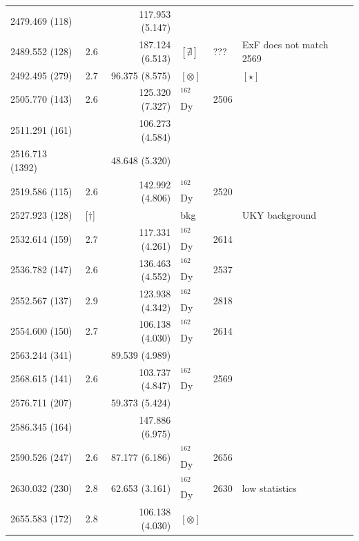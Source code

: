 \begin{landscape}
\begin{center}
\begin{longtable}{p{2.6cm}|p{1.2cm}|r|p{1.1cm}|p{2.0cm}|l}
  2479.469 (118) &            &117.953  (5.147)& & & \\   
  2489.552 (128) & 2.6        &187.124  (6.513)& $[\nexists]$ & ??? & ExF does not match 2569\\  
  2492.495 (279) & 2.7        & 96.375  (8.575)& $[\otimes]$ & &$[\star]$ \\   
  2505.770 (143) & 2.6        &125.320  (7.327)& $^{162}$Dy & 2506 & \\   
  2511.291 (161) &            &106.273  (4.584)& & & \\   
  2516.713 (1392)&            & 48.648  (5.320)& & & \\   
  2519.586 (115) & 2.6        &142.992  (4.806)& $^{162}$Dy & 2520 & \\   %
  2527.923 (128) & [$\dagger$]  && bkg & & UKY background \\   
  2532.614 (159) & 2.7        &117.331  (4.261)& $^{162}$Dy & 2614 & \\   
  2536.782 (147) & 2.6        &136.463  (4.552)& $^{162}$Dy & 2537 & \\
  2552.567 (137) & 2.9        &123.938  (4.342)& $^{162}$Dy & 2818 & \\   
  2554.600 (150) & 2.7        &106.138  (4.030)& $^{162}$Dy & 2614 & \\ 
  2563.244 (341) &            & 89.539  (4.989)& & & \\   
  2568.615 (141) & 2.6        &103.737  (4.847)& $^{162}$Dy & 2569 & \\   
  2576.711 (207) &            &59.373  (5.424)& & & \\   
  2586.345 (164) &            &147.886  (6.975)& & & \\   
  2590.526 (247) & 2.6        & 87.177  (6.186)& $^{162}$Dy & 2656 & \\   
  2630.032 (230) & 2.8        &62.653  (3.161)& $^{162}$Dy & 2630 & low statistics \\   
  2655.583 (172) & 2.8        &106.138  (4.030)& $[\otimes]$ & & \\   

\end{longtable}
\end{center}
\end{landscape}
